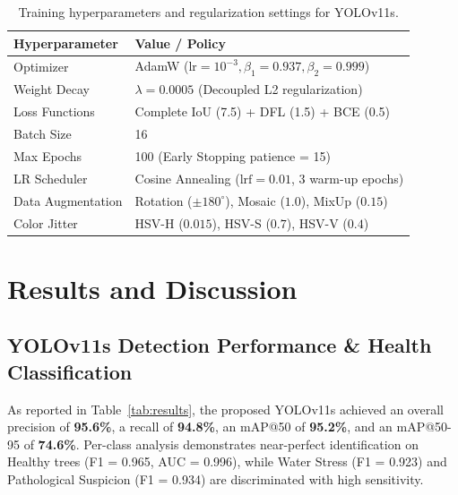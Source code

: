 \documentclass[5p,times]{elsarticle}
\begin{document}
\begin{table}[htbp]
\centering
\caption{Training hyperparameters and regularization settings for YOLOv11s.}
\label{tab:hyperparams}
\small
\begin{tabular}{ll}
\toprule
\textbf{Hyperparameter} & \textbf{Value / Policy} \\
\midrule
Optimizer & AdamW ($\text{lr} = 10^{-3}, \beta_1=0.937, \beta_2=0.999$) \\
Weight Decay & $\lambda = 0.0005$ (Decoupled L2 regularization) \\
Loss Functions & Complete IoU (7.5) + DFL (1.5) + BCE (0.5) \\
Batch Size & 16 \\
Max Epochs & 100 (Early Stopping patience = 15) \\
LR Scheduler & Cosine Annealing ($\text{lrf} = 0.01$, 3 warm-up epochs) \\
Data Augmentation & Rotation ($\pm 180^\circ$), Mosaic ($1.0$), MixUp ($0.15$) \\
Color Jitter & HSV-H ($0.015$), HSV-S ($0.7$), HSV-V ($0.4$) \\
\bottomrule
\end{tabular}
\end{table}

\section{Results and Discussion}
\subsection{YOLOv11s Detection Performance \& Health Classification}
As reported in Table~\ref{tab:results}, the proposed YOLOv11s achieved an overall precision of \textbf{95.6\%}, a recall of \textbf{94.8\%}, an mAP@50 of \textbf{95.2\%}, and an mAP@50-95 of \textbf{74.6\%}. Per-class analysis demonstrates near-perfect identification on Healthy trees (F1 = 0.965, AUC = 0.996), while Water Stress (F1 = 0.923) and Pathological Suspicion (F1 = 0.934) are discriminated with high sensitivity.
\end{document}
